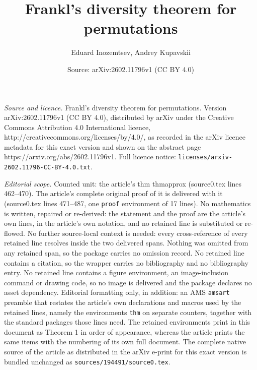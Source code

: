 \documentclass[10pt,a4paper]{amsart}
\title{Frankl's diversity theorem for permutations}
\author{Eduard Inozemtsev, Andrey Kupavskii}
\date{Source: arXiv:2602.11796v1 (CC BY 4.0)}
\begin{document}
\maketitle

\noindent\emph{Source and licence.} Frankl's diversity theorem for permutations. Version arXiv:2602.11796v1 (CC BY 4.0), distributed by arXiv under the Creative Commons Attribution 4.0 International licence, http://creativecommons.org/licenses/by/4.0/, as recorded in the arXiv licence metadata for this exact version and shown on the abstract page https://arxiv.org/abs/2602.11796v1. Full licence notice: \texttt{licenses/arxiv-2602.11796-CC-BY-4.0.txt}.\par\smallskip

\noindent\textit{Editorial scope.} Counted unit: the article's thm thmapprox (source0.tex lines 462--470). The article's complete original proof of it is delivered with it (source0.tex lines 471--487, one \texttt{proof} environment of 17 lines). No mathematics is written, repaired or re-derived: the statement and the proof are the article's own lines, in the article's own notation, and no retained line is substituted or re-flowed.  No further source-local context is needed: every cross-reference of every retained line resolves inside the two delivered spans.  Nothing was omitted from any retained span, so the package carries no omission record.  No retained line contains a citation, so the wrapper carries no bibliography and no bibliography entry.  No retained line contains a figure environment, an image-inclusion command or drawing code, so no image is delivered and the package declares no asset dependency.  Editorial formatting only, in addition: an AMS \texttt{amsart} preamble that restates the article's own declarations and macros used by the retained lines, namely the environments \texttt{thm} on separate counters, together with the standard packages those lines need.  The retained environments print in this document as Theorem 1 in order of appearance, whereas the article prints the same items with the numbering of its own full document.  The complete native source of the article as distributed in the arXiv e-print for this exact version is bundled unchanged as \texttt{sources/194491/source0.tex}.
\end{document}
